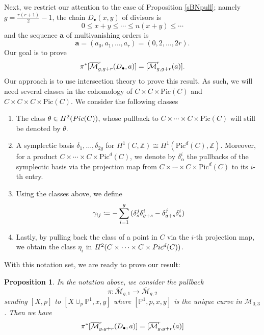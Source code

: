 \documentclass{article}
\theoremstyle{plain}
\newtheorem{prop}[trm]{Proposition}
\theoremstyle{definition}
\def\cM{\mathcal{M}}
\def\mm{\overline{\mathcal{M}}}
\begin{document}
Next, we restrict our attention to the case of Proposition \ref{sBNpull}; namely $g = \frac{r(r+1)}{2}-1$, the chain $D_\bullet(x,y)$ of divisors is 
\[ 0 \leq x+y\leq \cdots \leq n(x+y) \leq \cdots   \]
and the sequence $\textbf{a}$ of multivanishing orders is 
\[ \textbf{a}  = (a_0, a_1,\ldots, a_r)  = (0,2,\ldots, 2r). \]
Our goal is to prove 
 	\[\pi^*[\mm^r_{g, g+r}\text{\large (}D_{\bullet}, \textbf{a}\text{\large )}] = [\mm^r_{g,g+r}(\textbf{a})].\]
Our approach is to use intersection theory to prove this result. As such, we will need several classes in the cohomology of $C\times C\times \textrm{Pic}(C)$ and $C\times C\times C\times \textrm{Pic}(C)$. We consider the following classes 
\begin{enumerate}
	\item The class $\theta \in H^2 \text{\large(} \textrm{Pic}(C) \text{\large)} $, whose pullback to $C\times \cdots \times C \times \textrm{Pic}(C)$ will still be denoted by $\theta$. 
	\item A symplectic basis $\delta_1, \ldots, \delta_{2g}$ for $H^1(C, \mathbb{Z})\cong H^1(\textrm{Pic}^d(C), \mathbb{Z})$. Moreover, for a product $C\times \cdots \times C \times \textrm{Pic}^d(C)$, we denote by $\delta^i_{\alpha}$ the pullbacks of the symplectic basis via the projection map from $C\times \cdots \times C \times \textrm{Pic}^d(C)$ to its $i$-th entry. 
	\item Using the classes above, we define 
	\[ \gamma_{ij} \coloneqq - \sum_{i=1}^g \text{\Large(} \delta^j_s\delta^i_{g+s}-\delta^j_{g+s}\delta^i_s\text{\Large )}\]
    \item Lastly, by pulling back the class of a point in $C$ via the $i$-th projection map, we obtain the class $\eta_i$ in $H^2\text{\Large (}C\times \cdots \times C \times \textrm{Pic}^d(C)\text{\Large )}$.
\end{enumerate} 
With this notation set, we are ready to prove our result: 
 \begin{prop} \label{FTsimilar} \normalfont
 	In the notation above, we consider the pullback 
 	\[ \pi\colon \mm_{g,1}\rightarrow \mm_{g,2} \]
 	sending $[X,p]$ to $[X\cup_p\mathbb{P}^1,x,y]$ where $[\mathbb{P}^1,p,x,y]$ is the unique curve in $\cM_{0,3}$. Then we have  
 	\[\pi^*[\mm^r_{g, g+r}\text{\large (}D_{\bullet}, \textbf{a}\text{\large )}] = [\mm^r_{g,g+r}(\textbf{a})]\]
  \end{prop}
\end{document}
